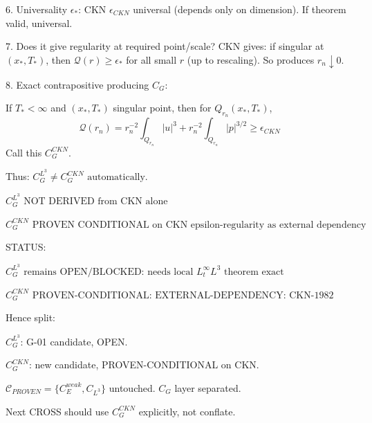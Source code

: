 \documentclass[11pt]{article}
\begin{document}
6. Universality $\epsilon_*$:
CKN $\epsilon_{CKN}$ universal (depends only on dimension). If theorem valid, universal.

7. Does it give regularity at required point/scale?
CKN gives: if singular at $(x_*,T_*)$, then $\mathcal{Q}(r)\ge\epsilon_*$ for all small $r$ (up to rescaling). So produces $r_n\downarrow0$.

8. Exact contrapositive producing $C_G$:

If $T_*<\infty$ and $(x_*,T_*)$ singular point, then for $Q_{r_n}(x_*,T_*)$,
\begin{equation*}
\boxed{\mathcal{Q}(r_n)= r_n^{-2}\int_{Q_{r_n}}|u|^3 + r_n^{-2}\int_{Q_{r_n}}|p|^{3/2} \ge \epsilon_{CKN}}
\end{equation*}
Call this $\boxed{C_G^{CKN}}$.

Thus:
$\boxed{C_G^{L^3}\neq C_G^{CKN}\text{ automatically}}$.

$\boxed{C_G^{L^3}\text{ NOT DERIVED from CKN alone}}$

$\boxed{C_G^{CKN}\text{ PROVEN CONDITIONAL on CKN epsilon-regularity as external dependency}}$

STATUS:

$\boxed{C_G^{L^3}\text{ remains OPEN/BLOCKED: needs local }L^\infty_t L^3\text{ theorem exact}}$

$\boxed{C_G^{CKN}\text{ PROVEN-CONDITIONAL: EXTERNAL-DEPENDENCY: CKN-1982}}$

Hence split:

$C_G^{L^3}$: G-01 candidate, OPEN.

$C_G^{CKN}$: new candidate, PROVEN-CONDITIONAL on CKN.

$\mathcal{C}_{PROVEN}=\{C_E^{weak},C_{L^3}\}$ untouched. $C_G$ layer separated.

Next CROSS should use $C_G^{CKN}$ explicitly, not conflate.
\end{document}

